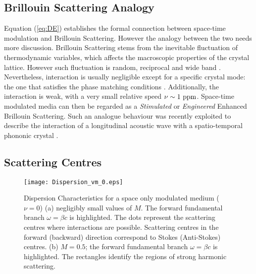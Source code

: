 \documentclass[journal]{IEEEtran}
\begin{document}
\subsection{Brillouin Scattering Analogy}
Equation (\ref{eq:DE}) establishes the formal connection between space-time modulation and Brillouin Scattering. However the analogy between the two needs more discussion. Brillouin Scattering stems from the inevitable fluctuation of thermodynamic variables, which affects the macroscopic properties of the crystal lattice. However such fluctuation is random, reciprocal and wide band \cite{Fabelinskii}. Nevertheless, interaction is usually negligible except for a specific crystal mode: the one that satisfies the phase matching conditions \cite{Fabelinskii, Boyd}. Additionally, the interaction is weak, with a very small relative speed $\nu\sim 1~ \textnormal{ppm}$. Space-time modulated media can then be regarded as a \emph{Stimulated} or \emph{Engineered} Enhanced Brillouin Scattering. Such an analogue behaviour was recently exploited to describe the interaction of a longitudinal acoustic wave with a spatio-temporal phononic crystal \cite{Croenne2017brillouin}.
\subsection{Scattering Centres}
\begin{figure}
\centering
\texttt{[image: Dispersion\_vm\_0.eps]}
\caption{Dispersion Characteristics for a space only modulated medium ($\nu=0$) (a) negligibly small values of $M$. The forward fundamental branch $\omega=\beta c$ is highlighted. The dots represent the scattering centres where interactions are possible. Scattering centres in the forward (backward) direction correspond to Stokes (Anti-Stokes) centres. (b)  $M=0.5$; the forward fundamental branch $\omega=\beta c$ is highlighted. The rectangles identify the regions of strong harmonic scattering.}
\label{fig:Dispersion_vm0}
\end{figure}
\end{document}
